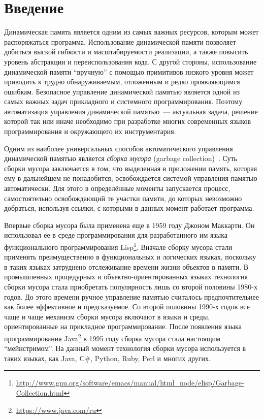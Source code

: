 \setcounter{page}{4}
\section*{Введение}

Динамическая память является одним из самых важных ресурсов, которым может распоряжаться программа. Использование
динамической памяти позволяет добиться выской гибкости и масштабируемости реализации, а также повысить уровень
абстракции и переиспользования кода. С другой стороны, использование динамической памяти ``вручную'' с помощью
примитивов низкого уровня может приводить к трудно обнаруживаемым, отложенным и редко проявляющимся ошибкам. 
Безопасное управление динамической памятью является одной из самых важных задач прикладного и системного программирования. 
Поэтому автоматизация управления динамической памятью~--- актуальная задача, решение которой так или иначе необходимо при
разработке многих современных языков программирования и окружающего их инструментария.

Одним из наиболее универсальных способов автоматического управления динамической памятью является \emph{сборка мусора} 
(garbage collection)~\cite{GCBook}. Суть сборки мусора заключается в том, что выделенная в приложении память, 
которая ему в дальнейшем не понадобится, освобождается системой управления памятью автоматически. Для этого в 
определённые моменты запускается процесс, самостоятельно освобождающий те участки памяти, до которых невозможно
добраться, используя ссылки, с которыми в данных момент работает программа.
 
Впервые сборка мусора была применена еще  в 1959 году Джоном Маккарти. Он использовал ее в среде программирования для 
разработанного им языка функционального программирования Lisp\footnote{\url{http://www.gnu.org/software/emacs/manual/html_node/elisp/Garbage-Collection.html}}.
Вначале сборку мусора стали применять преимущественно в функциональных и логических языках, поскольку в таких языках затруднено
отслеживание времени жизни объектов в памяти. В промышленных процедурных и объектно-ориентированных языках технология сборки мусора стала 
приобретать популярность лишь со второй половины 1980-х годов. До этого времени ручное управление памятью считалось предпочтительнее как более 
эффективное и предсказуемое. Со второй половины 1990-х годов все чаще и чаще механизм сборки мусора включают в языки и среды, ориентированные 
на прикладное программирование. После появления языка программирования Java\footnote{\url{https://www.java.com/ru}} в 1995 году 
сборка мусора стала настоящим ``мейнстримом''.  На данный момент технология сборки мусора используется в таких языках, как Java, C\#, 
Python, Ruby, Perl и многих других. 

